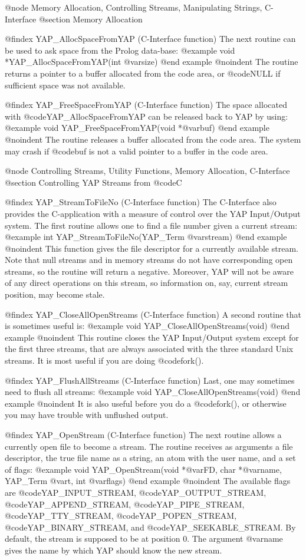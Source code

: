 {{{{{{{{{@node Memory Allocation, Controlling Streams, Manipulating Strings, C-Interface
@section Memory Allocation

@findex YAP_AllocSpaceFromYAP (C-Interface function)
The next routine can be used to ask space from the Prolog data-base:
@example
      void      *YAP_AllocSpaceFromYAP(int @var{size})
@end example
@noindent
The routine returns a pointer to a buffer allocated from the code area,
or @code{NULL} if sufficient space was not available.

@findex YAP_FreeSpaceFromYAP (C-Interface function)
The space allocated with @code{YAP_AllocSpaceFromYAP} can be released
back to YAP by using:
@example
      void      YAP_FreeSpaceFromYAP(void *@var{buf})
@end example
@noindent
The routine releases a buffer allocated from the code area. The system
may crash if @code{buf} is not a valid pointer to a buffer in the code
area.

@node Controlling Streams, Utility Functions, Memory Allocation, C-Interface
@section Controlling YAP Streams from @code{C}

@findex YAP_StreamToFileNo (C-Interface function)
The C-Interface also provides the C-application with a measure of
control over the YAP Input/Output system. The first routine allows one
to find a file number given a current stream:
@example
      int      YAP_StreamToFileNo(YAP_Term @var{stream})
@end example
@noindent
This function gives the file descriptor for a currently available
stream. Note that null streams and in memory streams do not have
corresponding open streams, so the routine will return a
negative. Moreover, YAP will not be aware of any direct operations on
this stream, so information on, say, current stream position, may become
stale.

@findex YAP_CloseAllOpenStreams (C-Interface function)
A second routine that is sometimes useful is:
@example
      void      YAP_CloseAllOpenStreams(void)
@end example
@noindent
This routine closes the YAP Input/Output system except for the first
three streams, that are always associated with the three standard Unix
streams. It is most useful if you are doing @code{fork()}.

@findex YAP_FlushAllStreams (C-Interface function)
Last, one may sometimes need to flush all streams:
@example
      void      YAP_CloseAllOpenStreams(void)
@end example
@noindent
It is also useful before you do a @code{fork()}, or otherwise you may
have trouble with unflushed output.

@findex YAP_OpenStream (C-Interface function)
The next routine allows a currently open file to become a stream. The
routine receives as arguments a file descriptor, the true file name as a
string, an atom with the user name, and a set of flags:
@example
      void      YAP_OpenStream(void *@var{FD}, char *@var{name}, YAP_Term @var{t}, int @var{flags})
@end example
@noindent
The available flags are @code{YAP_INPUT_STREAM},
@code{YAP_OUTPUT_STREAM}, @code{YAP_APPEND_STREAM},
@code{YAP_PIPE_STREAM}, @code{YAP_TTY_STREAM}, @code{YAP_POPEN_STREAM},
@code{YAP_BINARY_STREAM}, and @code{YAP_SEEKABLE_STREAM}. By default, the
stream is supposed to be at position 0. The argument @var{name} gives
the name by which YAP should know the new stream.

}}}}}}}}}

